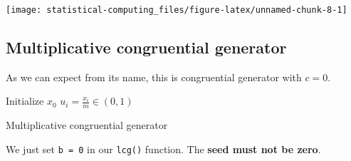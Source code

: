 \documentclass[]{book}
\newenvironment{Shaded}{\begin{snugshade}}{\end{snugshade}}
\newcommand{\DataTypeTok}[1]{\textcolor[rgb]{0.13,0.29,0.53}{#1}}
\newcommand{\DecValTok}[1]{\textcolor[rgb]{0.00,0.00,0.81}{#1}}
\newcommand{\KeywordTok}[1]{\textcolor[rgb]{0.13,0.29,0.53}{\textbf{#1}}}
\newcommand{\NormalTok}[1]{#1}
\newcommand{\OperatorTok}[1]{\textcolor[rgb]{0.81,0.36,0.00}{\textbf{#1}}}
\newcommand{\StringTok}[1]{\textcolor[rgb]{0.31,0.60,0.02}{#1}}
\theoremstyle{definition}
\theoremstyle{definition}
\theoremstyle{definition}
\theoremstyle{remark}
\begin{document}
\begin{Shaded}
\end{Shaded}

\begin{center}\texttt{[image: statistical-computing\_files/figure-latex/unnamed-chunk-8-1]} \end{center}

\hypertarget{multiplicative-congruential-generator}{%
\subsection{Multiplicative congruential generator}\label{multiplicative-congruential-generator}}

As we can expect from its name, this is congruential generator with \(c = 0\).

\begin{algorithm}[H] \label{alg:algmcg}
  \SetAlgoLined
  Initialize $x_0$\;
  $u_i = \frac{x_i}{m} \in (0, 1)$\;
  \caption{Multiplicative congruential generator}
\end{algorithm}

We just set \texttt{b\ =\ 0} in our \texttt{lcg()} function. The \textbf{seed must not be zero}.

\begin{Shaded}
\end{Shaded}
\end{document}
